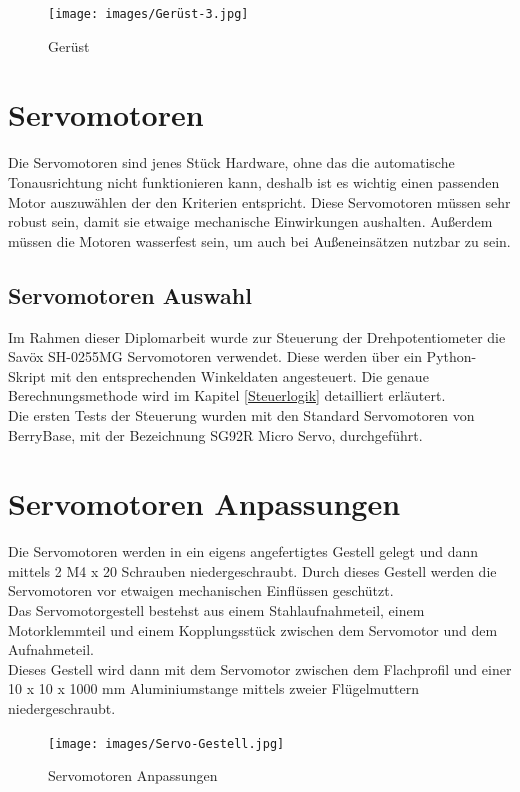 \begin{figure}[H]
	\centering
	\texttt{[image: images/Gerüst-3.jpg]}
	\caption[Gerüst]{Gerüst}
	\label{fig:Gerüst-2}
\end{figure}


\section{Servomotoren}
Die Servomotoren sind jenes Stück Hardware, ohne das die automatische Tonausrichtung nicht funktionieren kann, deshalb ist es wichtig einen passenden Motor auszuwählen der den Kriterien entspricht. Diese Servomotoren müssen sehr robust sein, damit sie etwaige mechanische Einwirkungen aushalten. Außerdem müssen die Motoren wasserfest sein, um auch bei Außeneinsätzen nutzbar zu sein. 

\newpage
\subsection{Servomotoren Auswahl}

Im Rahmen dieser Diplomarbeit wurde zur Steuerung der Drehpotentiometer die Savöx SH-0255MG Servomotoren verwendet. Diese werden über ein Python-Skript mit den entsprechenden Winkeldaten angesteuert. Die genaue Berechnungsmethode wird im Kapitel \ref{Steuerlogik} detailliert erläutert.\\
Die ersten Tests der Steuerung wurden mit den Standard Servomotoren von BerryBase, mit der Bezeichnung SG92R Micro Servo, durchgeführt.

\section{Servomotoren Anpassungen}
Die Servomotoren werden in ein eigens angefertigtes Gestell gelegt und dann mittels 2 M4 x 20 Schrauben niedergeschraubt. Durch dieses Gestell werden die Servomotoren vor etwaigen mechanischen Einflüssen geschützt. \\
Das Servomotorgestell bestehst aus einem Stahlaufnahmeteil, einem Motorklemmteil und einem Kopplungsstück zwischen dem Servomotor und dem Aufnahmeteil.\\
Dieses Gestell wird dann mit dem Servomotor zwischen dem Flachprofil und einer 10 x 10 x 1000 mm Aluminiumstange mittels zweier Flügelmuttern niedergeschraubt.\\
\begin{figure}[H]
	\centering
	\texttt{[image: images/Servo-Gestell.jpg]}
	\caption[Servomotoren Anpassungen]{Servomotoren Anpassungen}
	\label{fig:Servomotoren Gestell}
\end{figure}

